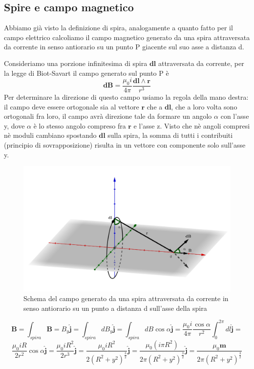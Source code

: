 \documentclass[
10pt, %
a4paper, %
oneside, %
headinclude,footinclude, %
BCOR5mm, %
]{scrartcl}
\begin{document}
\subsection{Spire e campo magnetico}
Abbiamo già visto la definizione di spira, analogamente a quanto fatto per il campo elettrico calcoliamo il campo magnetico generato da una spira attraversata da corrente in senso antiorario su un punto P giacente sul suo asse a distanza d. 
\begin{esercizio}
Consideriamo una porzione infinitesima di spira \(\mathbf{dl}\) attraversata da corrente, per la legge di Biot-Savart il campo generato sul punto P è
\[\mathbf{dB}=\frac{\mu_0 i}{4\pi}\frac{\mathbf{dl}\wedge\mathbf{r}}{r^3}\]
Per determinare la direzione di questo campo usiamo la regola della mano destra: il campo deve essere ortogonale sia al vettore \(\mathbf{r}\) che a \(\mathbf{dl}\), che a loro volta sono ortogonali fra loro, il campo avrà direzione tale da formare un angolo $\alpha$ con l'asse y, dove $\alpha$ è lo stesso angolo compreso fra \(\mathbf{r}\) e l'asse z. Visto che nè angoli compresi nè moduli cambiano spostando \(\mathbf{dl}\) sulla spira, la somma di tutti i contribuiti (principio di sovrapposizione) risulta in un vettore con componente solo sull'asse y. 
\begin{figure}[h!]
	\centering
	\includegraphics[width=0.7\linewidth]{../images/campo_magnetico_spira}
	\caption{Schema del campo generato da una spira attraversata da corrente in senso antiorario su un punto a distanza d sull'asse della spira}
	\label{fig:campomagneticospira}
\end{figure}
\FloatBarrier
\[\mathbf{B}=\int_{spira}\mathbf{B}= B_y\mathbf{\hat{j}}=\int_{spira}dB_y\mathbf{\hat{j}}=\int_{spira}dB\cos\alpha\mathbf{\hat{j}}=\frac{\mu_0 i}{4\pi}\frac{\cos\alpha}{r^2}\int_{0}^{2\pi}dl\mathbf{\hat{j}}=\]
\[\frac{\mu_0 i R}{2r^2}\cos\alpha \mathbf{\hat{j}}=\frac{\mu_0 i R^2}{2r^3} \mathbf{\hat{j}}=\frac{\mu_0 i R^2}{2(R^2+y^2)^{\frac{3}{2}}} \mathbf{\hat{j}}=\frac{\mu_0 (i \pi R^2)}{2\pi(R^2+y^2)^{\frac{3}{2}}} \mathbf{\hat{j}}=\frac{\mu_0 \mathbf{m}}{2\pi(R^2+y^2)^{\frac{3}{2}}}\]

\end{esercizio}
\end{document}
